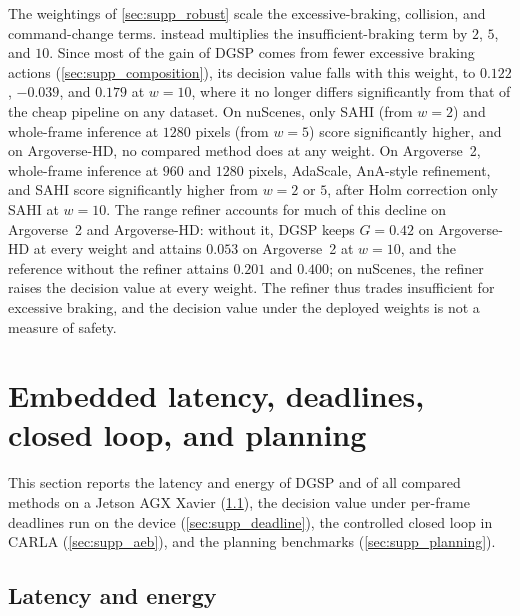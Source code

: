 \documentclass[10pt,letterpaper]{article}
\newcommand{\method}{DGSP\xspace}
\newcommand{\G}{G}
\theoremstyle{remark}
\theoremstyle{plain}
\theoremstyle{definition}
\begin{document}
The weightings of \cref{sec:supp_robust} scale the excessive-braking, collision, and command-change terms.
 instead multiplies the insufficient-braking term by $2$, $5$, and $10$.
Since most of the gain of \method comes from fewer excessive braking actions (\cref{sec:supp_composition}), its decision value falls with this weight, to $0.122$, $-0.039$, and $0.179$ at $w=10$, where it no longer differs significantly from that of the cheap pipeline on any dataset.
On nuScenes, only SAHI (from $w=2$) and whole-frame inference at $1280$ pixels (from $w=5$) score significantly higher, and on Argoverse-HD, no compared method does at any weight.
On Argoverse~2, whole-frame inference at $960$ and $1280$ pixels, AdaScale, AnA-style refinement, and SAHI score significantly higher from $w=2$ or $5$, after Holm correction only SAHI at $w=10$.
The range refiner accounts for much of this decline on Argoverse~2 and Argoverse-HD: without it, \method keeps $\G=0.42$ on Argoverse-HD at every weight and attains $0.053$ on Argoverse~2 at $w=10$, and the reference without the refiner attains $0.201$ and $0.400$; on nuScenes, the refiner raises the decision value at every weight.
The refiner thus trades insufficient for excessive braking, and the decision value under the deployed weights is not a measure of safety.

\section{Embedded latency, deadlines, closed loop, and planning}
\label{sec:supp_embedded}

This section reports the latency and energy of \method and of all compared methods on a Jetson AGX Xavier (\cref{sec:supp_latency}), the decision value under per-frame deadlines run on the device (\cref{sec:supp_deadline}), the controlled closed loop in CARLA (\cref{sec:supp_aeb}), and the planning benchmarks (\cref{sec:supp_planning}).

\subsection{Latency and energy}
\label{sec:supp_latency}
\end{document}
